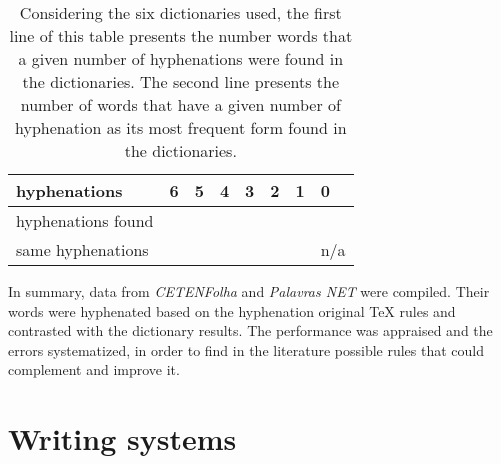 \documentclass{article}
\begin{document}
\begin{table}
\centering
\caption{Considering the six dictionaries used, the first line of this table
presents the number words that a given number of hyphenations were found in the
dictionaries. The second line presents the number of words that have a given
number of hyphenation as its most frequent form found in the
dictionaries.}\label{tblstats}
\small
\begin{tabular}{*{8}{l}}
    hyphenations & 6 & 5 & 4 & 3 & 2 & 1 & 0 \\
    \hline
    hyphenations found & \NumberOfSixHyphens{} & \NumberOfFiveHyphens{} &
    \NumberOfFourHyphen{} & \NumberOfThreeHyphens{} & \NumberOfTwoHyphens{} &
    \NumberOfOneHyphens{} & \NumberOfNoHyphens{} \\

    same hyphenations & \NumberOfSixAgrees{} & \NumberOfFiveAgrees{} &
    \NumberOfFourAgrees{} & \NumberOfThreeAgrees{} & \NumberOfTwoAgrees{} &
    \NumberOfOneAgrees{} & n/a
\end{tabular}
\end{table}

In summary, data from \emph{CETENFolha} and \emph{Palavras NET} were compiled.
Their words were hyphenated based on the hyphenation original \TeX{} rules and
contrasted with the dictionary results. The performance was appraised and the
errors systematized, in order to find in the literature possible rules that
could complement and improve it.


\section{Writing systems}\label{sec-writing-systems}
\end{document}
